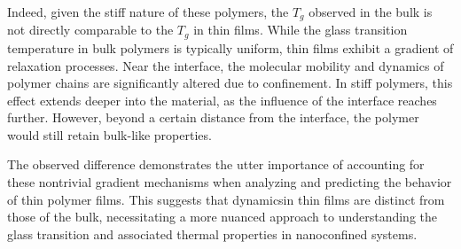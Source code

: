 Indeed, given the stiff nature of these polymers, the \(T_g\) observed in the bulk is not directly comparable to the \(T_g\) in thin films. While the glass transition temperature in bulk polymers is typically uniform, thin films exhibit a gradient of relaxation processes. Near the interface, the molecular mobility and dynamics of polymer chains are significantly altered due to confinement. In stiff polymers, this effect extends deeper into the material, as the influence of the interface reaches further. However, beyond a certain distance from the interface, the polymer would still retain bulk-like properties.

The observed difference demonstrates the utter importance of accounting for these nontrivial gradient mechanisms when analyzing and predicting the behavior of thin polymer films. This suggests that dynamicsin thin films are distinct from those of the bulk, necessitating a more nuanced approach to understanding the glass transition and associated thermal properties in nanoconfined systems.
